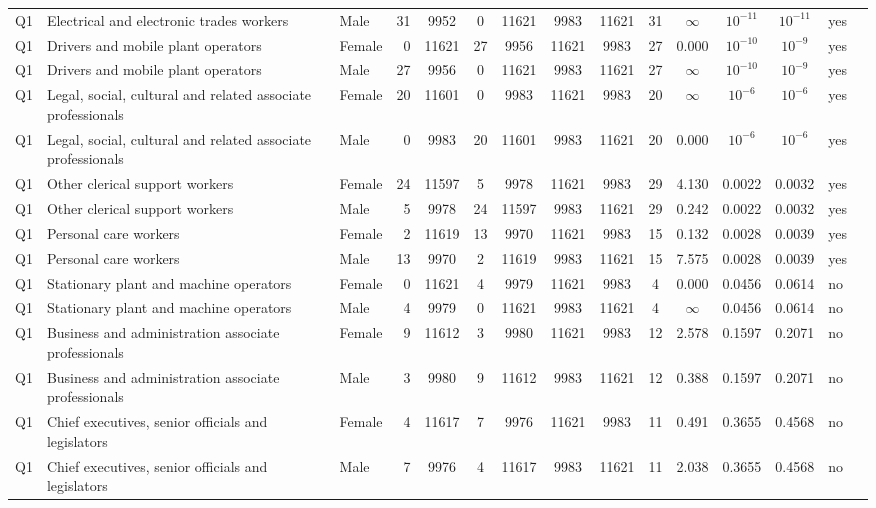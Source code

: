 \begin{longtable}{lllrcccccccccll}
Q1 & Electrical and electronic trades workers & Male & 31 & 9952 & 0 & 11621 & 9983 & 11621 & 31 & $\infty$ & $10^{-11}$ & $10^{-11}$ & yes \\
Q1 & Drivers and mobile plant operators & Female & 0 & 11621 & 27 & 9956 & 11621 & 9983 & 27 & 0.000 & $10^{-10}$ & $10^{-9}$ & yes \\
Q1 & Drivers and mobile plant operators & Male & 27 & 9956 & 0 & 11621 & 9983 & 11621 & 27 & $\infty$ & $10^{-10}$ & $10^{-9}$ & yes \\
Q1 & Legal, social, cultural and related associate professionals & Female & 20 & 11601 & 0 & 9983 & 11621 & 9983 & 20 & $\infty$ & $10^{-6}$ & $10^{-6}$ & yes \\
Q1 & Legal, social, cultural and related associate professionals & Male & 0 & 9983 & 20 & 11601 & 9983 & 11621 & 20 & 0.000 & $10^{-6}$ & $10^{-6}$ & yes \\
Q1 & Other clerical support workers & Female & 24 & 11597 & 5 & 9978 & 11621 & 9983 & 29 & 4.130 & 0.0022 & 0.0032 & yes \\
Q1 & Other clerical support workers & Male & 5 & 9978 & 24 & 11597 & 9983 & 11621 & 29 & 0.242 & 0.0022 & 0.0032 & yes \\
Q1 & Personal care workers & Female & 2 & 11619 & 13 & 9970 & 11621 & 9983 & 15 & 0.132 & 0.0028 & 0.0039 & yes \\
Q1 & Personal care workers & Male & 13 & 9970 & 2 & 11619 & 9983 & 11621 & 15 & 7.575 & 0.0028 & 0.0039 & yes \\
Q1 & Stationary plant and machine operators & Female & 0 & 11621 & 4 & 9979 & 11621 & 9983 & 4 & 0.000 & 0.0456 & 0.0614 & no \\
Q1 & Stationary plant and machine operators & Male & 4 & 9979 & 0 & 11621 & 9983 & 11621 & 4 & $\infty$ & 0.0456 & 0.0614 & no \\
Q1 & Business and administration associate professionals & Female & 9 & 11612 & 3 & 9980 & 11621 & 9983 & 12 & 2.578 & 0.1597 & 0.2071 & no \\
Q1 & Business and administration associate professionals & Male & 3 & 9980 & 9 & 11612 & 9983 & 11621 & 12 & 0.388 & 0.1597 & 0.2071 & no \\
Q1 & Chief executives, senior officials and legislators & Female & 4 & 11617 & 7 & 9976 & 11621 & 9983 & 11 & 0.491 & 0.3655 & 0.4568 & no \\
Q1 & Chief executives, senior officials and legislators & Male & 7 & 9976 & 4 & 11617 & 9983 & 11621 & 11 & 2.038 & 0.3655 & 0.4568 & no \\

\end{longtable}
